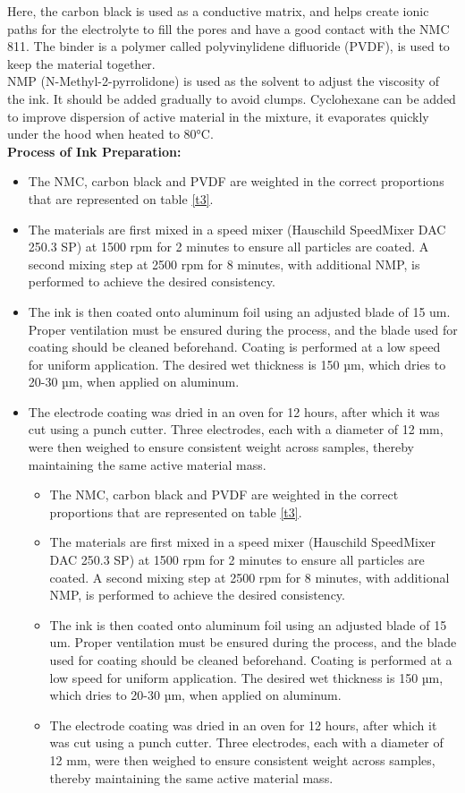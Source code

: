\documentclass{article}
\begin{document}
{Here, the carbon black is used as a conductive matrix, and helps create ionic paths for the electrolyte to fill the pores and have a good contact with the NMC 811\cite{Itou}. The binder is a polymer called polyvinylidene difluoride (PVDF),
is used to keep the material together.\\

NMP (N-Methyl-2-pyrrolidone) is used as the solvent to adjust the viscosity of the ink. It should be added gradually to avoid clumps. Cyclohexane can be added to improve dispersion of active material in the mixture, it evaporates quickly under the hood when heated to 80°C.\\

\textbf{Process of Ink Preparation:}\\
\begin{itemize}
  \item The NMC, carbon black and PVDF are weighted in the correct proportions that are represented on 
  table \ref{t3}.
  \item The materials are first mixed in a speed mixer (Hauschild SpeedMixer DAC 250.3 SP)  at 1500 rpm for 2 minutes to ensure all particles are coated. A second mixing step at 2500 rpm for 8 minutes, with additional NMP, is performed to achieve the desired consistency.
  \item The ink is then coated onto aluminum foil using an adjusted blade of 15 um. Proper ventilation must be ensured during the process, and the blade used for coating should be cleaned beforehand. Coating is performed at a low speed for uniform application. The desired wet thickness is 150 µm, which dries to 20-30 µm, when applied on aluminum.
  \item The electrode coating was dried in an oven for 12 hours, after which it was cut using a punch cutter. Three electrodes, each with a diameter of 12 mm, were then weighed to ensure consistent weight across samples, thereby maintaining the same active material mass.
  \begin{itemize}
    \item The NMC, carbon black and PVDF are weighted in the correct proportions that are represented on 
    table \ref{t3}.
    \item The materials are first mixed in a speed mixer (Hauschild SpeedMixer DAC 250.3 SP)  at 1500 rpm for 2 minutes to ensure all particles are coated. A second mixing step at 2500 rpm for 8 minutes, with additional NMP, is performed to achieve the desired consistency.
    \item The ink is then coated onto aluminum foil using an adjusted blade of 15 um. Proper ventilation must be ensured during the process, and the blade used for coating should be cleaned beforehand. Coating is performed at a low speed for uniform application. The desired wet thickness is 150 µm, which dries to 20-30 µm, when applied on aluminum.
    \item The electrode coating was dried in an oven for 12 hours, after which it was cut using a punch cutter. Three electrodes, each with a diameter of 12 mm, were then weighed to ensure consistent weight across samples, thereby maintaining the same active material mass.
\end{itemize}


\end{itemize}}
\end{document}
